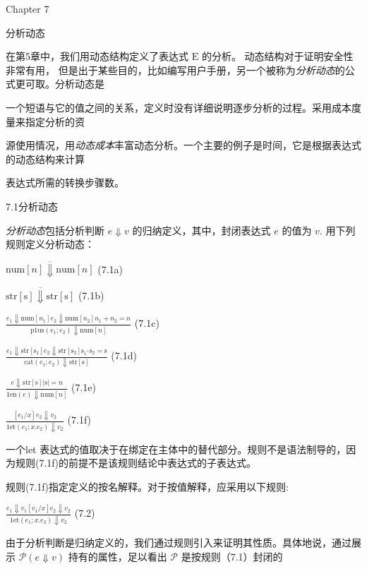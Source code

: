 

Chapter 7

分析动态

在第5章中，我们用动态结构定义了表达式 $\mathrm{E}$ 的分析。 动态结构对于证明安全性非常有用，
但是出于某些目的，比如编写用户手册，另一个被称为{\it 分析动态}的公式更可取。分析动态是

一个短语与它的值之间的关系，定义时没有详细说明逐步分析的过程。采用成本度量来指定分析的资

源使用情况，用{\it 动态成本}丰富动态分析。一个主要的例子是时间，它是根据表达式的动态结构来计算

表达式所需的转换步骤数。

7.1分析动态

{\it 分析动态}包括分析判断 $e\Downarrow v$ 的归纳定义，其中，封闭表达式 $e$ 的值为 $v$. 用下列规则定义分析动态：
\begin{center}
$\overline{\mathrm{n}\mathrm{u}\mathrm{m}[n]\Downarrow \mathrm{n}\mathrm{u}\mathrm{m}[n]}$   (7.1a)

$\overline{\mathrm{s}\mathrm{t}\mathrm{r}[\mathrm{s}]\Downarrow \mathrm{s}\mathrm{t}\mathrm{r}[\mathrm{s}]}$   (7.1b)

$\displaystyle \frac{e_{1}\Downarrow \mathrm{n}\mathrm{u}\mathrm{m}[n_{1}]e_{2}\Downarrow \mathrm{n}\mathrm{u}\mathrm{m}[n_{2}]n_{1}+n_{2}=n}{\mathrm{p}1\mathrm{u}\mathrm{s}(e_{1};e_{2})\Downarrow \mathrm{n}\mathrm{u}\mathrm{m}[n]}$   (7.1c)

$\displaystyle \frac{e_{1}\Downarrow \mathrm{s}\mathrm{t}\mathrm{r}[\mathrm{s}_{1}]e_{2}\Downarrow \mathrm{s}\mathrm{t}\mathrm{r}[\mathrm{s}_{2}]\mathrm{s}_{1^{\wedge}}\mathrm{s}_{2}=\mathrm{s}}{\mathrm{c}\mathrm{a}\mathrm{t}(e_{1};e_{2})\Downarrow \mathrm{s}\mathrm{t}\mathrm{r}[\mathrm{s}]}$   (7.1d)

$\displaystyle \frac{e\Downarrow \mathrm{s}\mathrm{t}\mathrm{r}[\mathrm{s}]|\mathrm{s}|=n}{1\mathrm{e}\mathrm{n}(e)\Downarrow \mathrm{n}\mathrm{u}\mathrm{m}[n]}$   (7.1e)

$\displaystyle \frac{[e_{1}/x]e_{2}\Downarrow v_{2}}{1\mathrm{e}\mathrm{t}(e_{1};x.e_{2})\Downarrow v_{2}}$   (7.1f)
\end{center}
一个let 表达式的值取决于在绑定在主体中的替代部分。规则不是语法制导的，因为规则(7.1f)的前提不是该规则结论中表达式的子表达式。

规则(7.1f)指定定义的按名解释。对于按值解释，应采用以下规则:

\begin{center}
$\displaystyle \frac{e_{1}\Downarrow v_{1}[v_{1}/x]e_{2}\Downarrow v_{2}}{1\mathrm{e}\mathrm{t}(e_{1};x.e_{2})\Downarrow v_{2}}$   (7.2)
\end{center}
由于分析判断是归纳定义的，我们通过规则引入来证明其性质。具体地说，通过展示 $\mathcal{P}(e\Downarrow v)$ 持有的属性，足以看出 $\mathcal{P}$ 是按规则（7.1）封闭的

